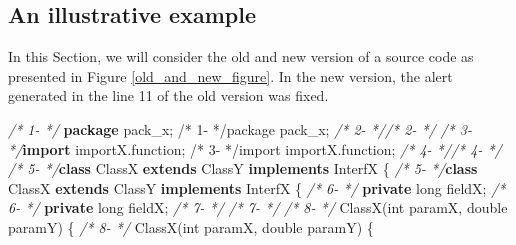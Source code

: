 \documentclass[
]{article}
\newenvironment{Shaded}{\begin{snugshade}}{\end{snugshade}}
\newcommand{\CommentTok}[1]{\textcolor[rgb]{0.56,0.35,0.01}{\textit{#1}}}
\newcommand{\DataTypeTok}[1]{\textcolor[rgb]{0.13,0.29,0.53}{#1}}
\newcommand{\FunctionTok}[1]{\textcolor[rgb]{0.00,0.00,0.00}{#1}}
\newcommand{\ImportTok}[1]{#1}
\newcommand{\KeywordTok}[1]{\textcolor[rgb]{0.13,0.29,0.53}{\textbf{#1}}}
\newcommand{\NormalTok}[1]{#1}
\begin{document}

\newpage
\begin{landscape}

\subsection{An illustrative example}\label{source_used}

In this Section, we will consider the old and new version of a source
code as presented in Figure \ref{old_and_new_figure}. In the new version, the alert generated in
the line 11 of the old version was fixed.

\vspace{16px}
\scriptsize

\begin{Shaded}
\begin{Highlighting}[]
\CommentTok{/*  1-                 */}
\KeywordTok{package}\ImportTok{ pack_x;                                                /*  1-                 */package pack_x;}                                                
\CommentTok{/*  2-                 */}\CommentTok{/*  2-                 */}                                                               
\CommentTok{/*  3-                 */}\KeywordTok{import}\ImportTok{ importX.function;                                       /*  3-                 */import importX.function;}
\CommentTok{/*  4-                 */}\CommentTok{/*  4-                 */}
\CommentTok{/*  5-                 */}\KeywordTok{class}\NormalTok{ ClassX }\KeywordTok{extends}\NormalTok{ ClassY }\KeywordTok{implements}\NormalTok{ InterfX \{               }\CommentTok{/*  5-                 */}\KeywordTok{class}\NormalTok{ ClassX }\KeywordTok{extends}\NormalTok{ ClassY }\KeywordTok{implements}\NormalTok{ InterfX \{               }
\CommentTok{/*  6-                 */}    \KeywordTok{private} \DataTypeTok{long}\NormalTok{ fieldX;                                       }\CommentTok{/*  6-                 */}    \KeywordTok{private} \DataTypeTok{long}\NormalTok{ fieldX;                                       }
\CommentTok{/*  7-                 */}                                                               \CommentTok{/*  7-                 */}                                                               
\CommentTok{/*  8-                 */}    \FunctionTok{ClassX}\NormalTok{(}\DataTypeTok{int}\NormalTok{ paramX, }\DataTypeTok{double}\NormalTok{ paramY) \{                        }\CommentTok{/*  8-                 */}    \FunctionTok{ClassX}\NormalTok{(}\DataTypeTok{int}\NormalTok{ paramX, }\DataTypeTok{double}\NormalTok{ paramY) \{ }

\end{Highlighting}
\end{Shaded}
\end{landscape}
\end{document}
